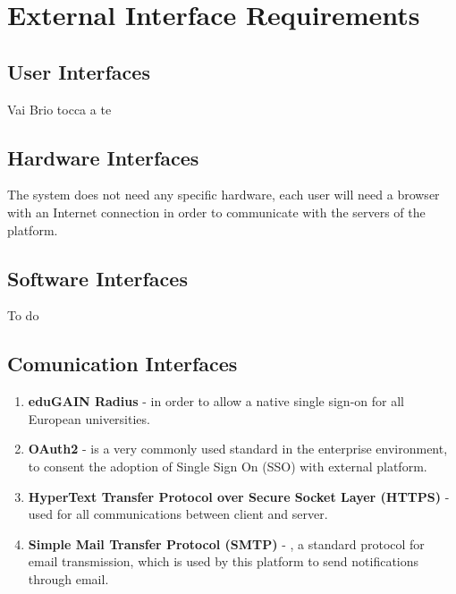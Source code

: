 \section{External Interface Requirements}

\subsection{User Interfaces}
Vai Brio tocca a te


\subsection{Hardware Interfaces}
The system does not need any specific hardware, each user will need a browser with an Internet connection in order to communicate with the servers of the platform.

\subsection{Software Interfaces}
To do

\subsection{Comunication Interfaces}
\begin{enumerate}
    \item \textbf{eduGAIN Radius} - in order to allow a native single sign-on for all European universities.
    \item \textbf{OAuth2} - is a very commonly used standard in the enterprise environment, to consent the adoption of Single Sign On (SSO) with external platform.
    \item \textbf{HyperText Transfer Protocol over Secure Socket Layer (HTTPS)} - used for all communications between client  and server.
    \item \textbf{Simple Mail Transfer Protocol (SMTP)} - , a standard protocol for email transmission, which is used by this platform to send notifications through email.
\end{enumerate}

